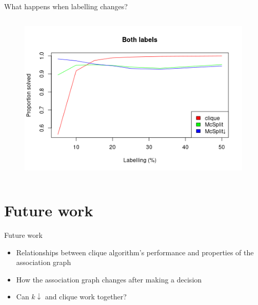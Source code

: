 \documentclass{beamer}
\begin{document}
\begin{frame}{What happens when labelling changes?}
\begin{columns}
\begin{column}{0.5\textwidth}
      \begin{figure}
        \centering
        \includegraphics[width=\textwidth]{../dissertation/images/both_labels_linechart.png}
      \end{figure}
    \end{column}
  \end{columns}
\end{frame}

\section{Future work}
\begin{frame}{Future work}
  \begin{itemize}
  \item Relationships between clique algorithm's performance and properties of
    the association graph
  \item How the association graph changes after making a decision
  \item Can $k\downarrow$ and clique work together?
  \end{itemize}
\end{frame}
\end{document}
